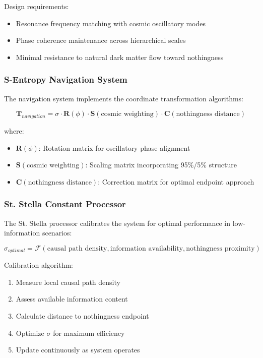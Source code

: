 \documentclass[11pt,a4paper]{article}
\theoremstyle{remark}
\begin{document}
Design requirements:
\begin{itemize}
\item Resonance frequency matching with cosmic oscillatory modes
\item Phase coherence maintenance across hierarchical scales
\item Minimal resistance to natural dark matter flow toward nothingness
\end{itemize}

\subsubsection{S-Entropy Navigation System}

The navigation system implements the coordinate transformation algorithms:

\begin{equation}
\mathbf{T}_{navigation} = \sigma \cdot \mathbf{R}(\phi) \cdot \mathbf{S}(\text{cosmic weighting}) \cdot \mathbf{C}(\text{nothingness distance})
\end{equation}

where:
\begin{itemize}
\item $\mathbf{R}(\phi)$: Rotation matrix for oscillatory phase alignment
\item $\mathbf{S}(\text{cosmic weighting})$: Scaling matrix incorporating 95\%/5\% structure
\item $\mathbf{C}(\text{nothingness distance})$: Correction matrix for optimal endpoint approach
\end{itemize}

\subsubsection{St. Stella Constant Processor}

The St. Stella processor calibrates the system for optimal performance in low-information scenarios:

\begin{equation}
\sigma_{optimal} = \mathcal{F}(\text{causal path density}, \text{information availability}, \text{nothingness proximity})
\end{equation}

Calibration algorithm:
\begin{enumerate}
\item Measure local causal path density
\item Assess available information content
\item Calculate distance to nothingness endpoint
\item Optimize $\sigma$ for maximum efficiency
\item Update continuously as system operates
\end{enumerate}
\end{document}
